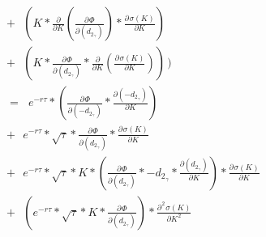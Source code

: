 \documentclass[12pt]{article}
\begin{document}
{\begin{align*}
\\[12pt]
&+ \hspace{8pt}   (K * \frac{\partial}{\partial K}(\frac{\partial \hspace{1pt} \Phi}{\partial (d_{2_{\hspace{1pt} \gamma}})}) * \frac{\partial \hspace{1pt} \sigma(K)}{\partial K})
\\[12pt]
&+ \hspace{8pt}   (K * \frac{\partial \hspace{1pt} \Phi}{\partial (d_{2_{\hspace{1pt} \gamma}})} * \frac{\partial}{\partial K}(\frac{\partial \hspace{1pt} \sigma(K)}{\partial K}))\hspace{2pt})
\\[35pt]
\hspace{3pt} &= \hspace{7pt}   e^{-r \tau} * (\frac{\partial \hspace{1pt} \Phi}{\partial (-d_{2_{\hspace{1pt} \gamma}})} * \frac{\partial (-d_{2_{\hspace{1pt} \gamma}})}{\partial K})
\\[12pt]
&+ \hspace{8pt}   e^{-r \tau} * \sqrt{\tau} * \frac{\partial \hspace{1pt} \Phi}{\partial (d_{2_{\hspace{1pt} \gamma}})} * \frac{\partial \hspace{1pt} \sigma(K)}{\partial K}
\\[12pt]
&+ \hspace{8pt}   e^{-r \tau} * \sqrt{\tau} * K * (\frac{\partial \hspace{1pt} \Phi}{\partial (d_{2_{\hspace{1pt} \gamma}})} * -d_{2_{\hspace{1pt} \gamma}} * \frac{\partial (d_{2_{\hspace{1pt} \gamma}})}{\partial K}) * \frac{\partial \hspace{1pt} \sigma(K)}{\partial K}
\\[12pt]
&+ \hspace{8pt}   (e^{-r \tau} * \sqrt{\tau} * K * \frac{\partial \hspace{1pt} \Phi}{\partial (d_{2_{\hspace{1pt} \gamma}})}) * \frac{\partial^{\hspace{1pt} 2} \hspace{1pt} \sigma(K)}{\partial K^{\hspace{1pt} 2}}

\end{align*}}
\end{document}

